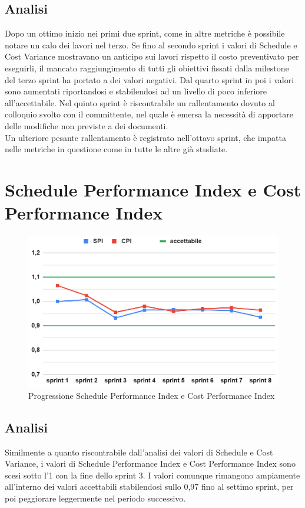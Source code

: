 \subsection{Analisi}
Dopo un ottimo inizio nei primi due sprint, come in altre metriche è possibile notare un calo dei lavori nel terzo. Se fino al secondo sprint i valori di Schedule e Cost Variance mostravano un anticipo sui lavori rispetto il costo preventivato per eseguirli, il mancato raggiungimento di tutti gli obiettivi fissati dalla milestone del terzo sprint ha portato a dei valori negativi. Dal quarto sprint in poi i valori sono aumentati riportandosi e stabilendosi ad un livello di poco inferiore all'accettabile. Nel quinto sprint è riscontrabile un rallentamento dovuto al colloquio svolto con il committente, nel quale è emersa la necessità di apportare delle modifiche non previste a dei documenti.\\
Un ulteriore pesante rallentamento è registrato nell'ottavo sprint, che impatta nelle metriche in questione come in tutte le altre già studiate.

\section{Schedule Performance Index e Cost Performance Index}
\begin{figure}[H]
    \centering
    \includegraphics[width=0.8\linewidth]{SPICPI.png}
    \caption{Progressione Schedule Performance Index e Cost Performance Index}
\end{figure}
\subsection{Analisi}
Similmente a quanto riscontrabile dall'analisi dei valori di Schedule e Cost Variance, i valori di Schedule Performance Index e Cost Performance Index sono scesi sotto l'1 con la fine dello sprint 3. I valori comunque rimangono ampiamente all'interno dei valori accettabili stabilendosi sullo 0,97 fino al settimo sprint, per poi peggiorare leggermente nel periodo successivo.

